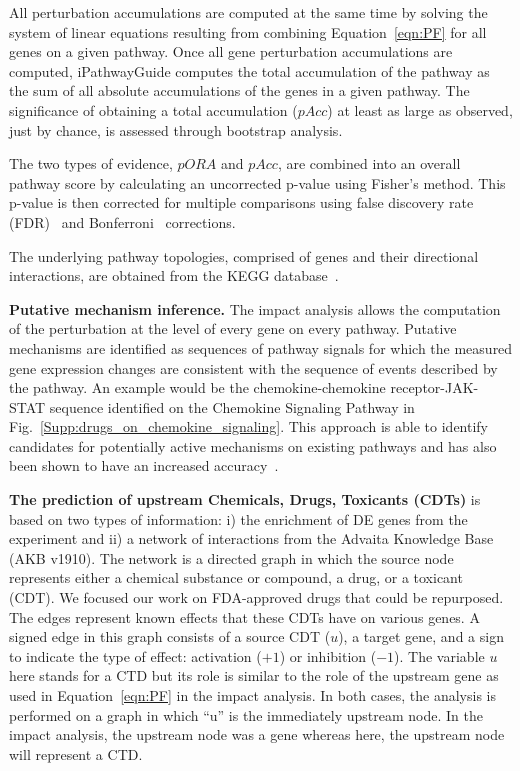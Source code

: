 All perturbation accumulations are computed at the same time by solving the system of linear equations resulting from combining Equation~\ref{eqn:PF} for all genes on a given pathway. Once all gene perturbation accumulations are computed, iPathwayGuide computes the total accumulation of the pathway as the sum of all absolute accumulations of the genes in a given pathway. The significance of obtaining a total accumulation ($pAcc$) at least as large as observed, just by chance, is assessed through bootstrap analysis.

The two types of evidence, $pORA$ and $pAcc$, are combined into an overall pathway score by calculating an uncorrected p-value using Fisher's method. This p-value is then corrected for multiple comparisons using false discovery rate (FDR)~\cite{Benjamini:1995,  Benjamini:2001} and Bonferroni~\cite{Bonferroni:1935} corrections. 


The underlying pathway topologies, comprised of genes and their directional interactions, are obtained from the KEGG database~\cite{ogata1999kegg, kanehisa2010kegg, kanehisa2012kegg,  kanehisa2014data}.


\textbf{Putative mechanism inference.} The impact analysis  allows the computation of the perturbation at the level of every gene on every pathway. Putative mechanisms are identified as sequences of pathway signals for which the measured gene expression changes are consistent with the sequence of events described by the pathway. An example would be the chemokine-chemokine receptor-JAK-STAT sequence identified on the Chemokine Signaling Pathway  in Fig.~\ref{Supp:drugs_on_chemokine_signaling}. This approach is able to identify candidates for potentially active mechanisms on existing pathways and has also been shown to have an increased accuracy~\cite{nguyen2019identifying}. %


\textbf{The prediction of upstream Chemicals, Drugs, Toxicants (CDTs)} is based on two types of information: i) the enrichment of DE genes from the experiment and ii) a network of interactions from the Advaita Knowledge Base (AKB v1910). The network is a directed graph in which the source node represents either a chemical substance or compound, a drug, or a toxicant (CDT). We focused our work on FDA-approved drugs that could be repurposed. The edges represent known effects that these CDTs have on various genes. A signed edge in this graph consists of a source CDT ($u$), a target gene, and a sign to indicate the type of effect: activation ($+1$) or inhibition ($-1$). 
The variable $u$ here stands for a CTD but its role is similar to the role of the upstream gene as used in Equation~\ref{eqn:PF} in the impact analysis. In both cases, the analysis is performed on a graph in which ``u'' is the immediately upstream node. In the impact analysis, the upstream node was  a gene whereas here, the upstream node will represent a CTD.

